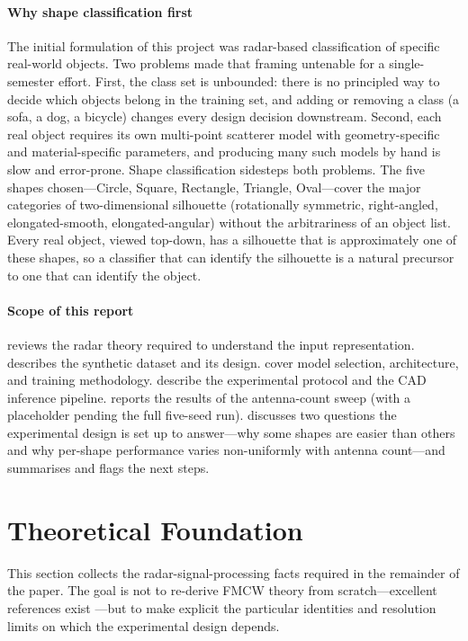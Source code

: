 \documentclass[letterpaper,11pt,leqno]{article}
\begin{document}
\paragraph{Why shape classification first} The initial formulation of this project was radar-based classification of specific real-world objects. Two problems made that framing untenable for a single-semester effort. First, the class set is unbounded: there is no principled way to decide which objects belong in the training set, and adding or removing a class (a sofa, a dog, a bicycle) changes every design decision downstream. Second, each real object requires its own multi-point scatterer model with geometry-specific and material-specific parameters, and producing many such models by hand is slow and error-prone. Shape classification sidesteps both problems. The five shapes chosen---Circle, Square, Rectangle, Triangle, Oval---cover the major categories of two-dimensional silhouette (rotationally symmetric, right-angled, elongated-smooth, elongated-angular) without the arbitrariness of an object list. Every real object, viewed top-down, has a silhouette that is approximately one of these shapes, so a classifier that can identify the silhouette is a natural precursor to one that can identify the object.

\paragraph{Scope of this report}  reviews the radar theory required to understand the input representation.  describes the synthetic dataset and its design.  cover model selection, architecture, and training methodology.  describe the experimental protocol and the CAD inference pipeline.  reports the results of the antenna-count sweep (with a placeholder pending the full five-seed run).  discusses two questions the experimental design is set up to answer---why some shapes are easier than others and why per-shape performance varies non-uniformly with antenna count---and  summarises and flags the next steps.

\section{Theoretical Foundation}\label{s:theory}

This section collects the radar-signal-processing facts required in the remainder of the paper. The goal is not to re-derive FMCW theory from scratch---excellent references exist \citep{Richards14,Ramasubramanian17,RaoFMCW}---but to make explicit the particular identities and resolution limits on which the experimental design depends.
\end{document}
